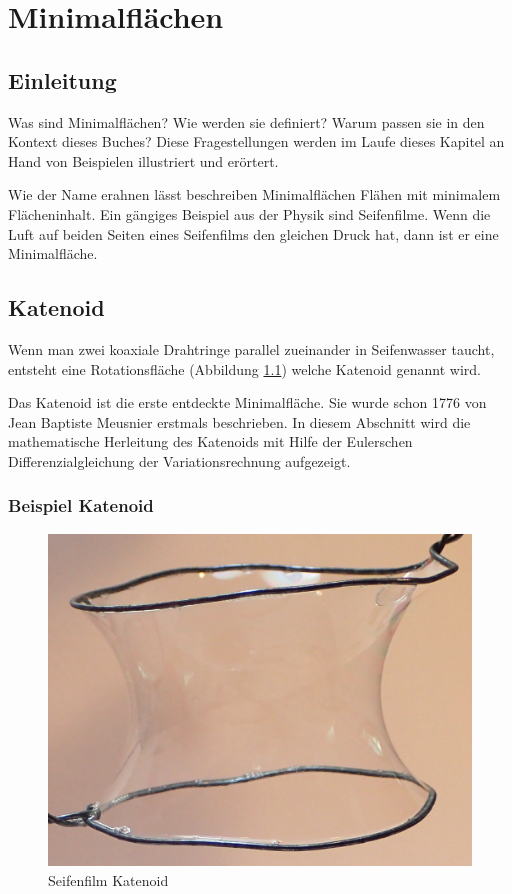 \chapter{Minimalflächen\label{chapter:thema}}
\begin{refsection}

\section{Einleitung}
Was sind Minimalflächen? 
Wie werden sie definiert? 
Warum passen sie in den Kontext dieses Buches?
Diese Fragestellungen werden im Laufe dieses Kapitel an Hand von Beispielen illustriert und erörtert.

Wie der Name erahnen lässt beschreiben Minimalflächen Flähen mit minimalem Flächeninhalt. 
Ein gängiges Beispiel aus der Physik sind Seifenfilme. Wenn die Luft auf beiden Seiten eines Seifenfilms den gleichen Druck hat, dann ist er eine Minimalfläche.


\section{Katenoid}
Wenn man zwei koaxiale Drahtringe parallel zueinander in Seifenwasser taucht, entsteht eine Rotationsfläche (Abbildung \ref{KatenoidSeifenfilm}) welche Katenoid genannt wird. 

Das Katenoid ist die erste entdeckte Minimalfläche.
Sie wurde schon 1776 von Jean Baptiste Meusnier erstmals beschrieben.
In diesem Abschnitt wird die mathematische Herleitung des Katenoids mit Hilfe der Eulerschen Differenzialgleichung der Variationsrechnung aufgezeigt.
\subsection{Beispiel Katenoid}

\begin{figure}
  \centering
  \includegraphics[scale=0.5]{minimal/Cartenoid_Foto.png}
  \caption{Seifenfilm Katenoid} 
  \label{KatenoidSeifenfilm}
\end{figure}



\end{refsection}
